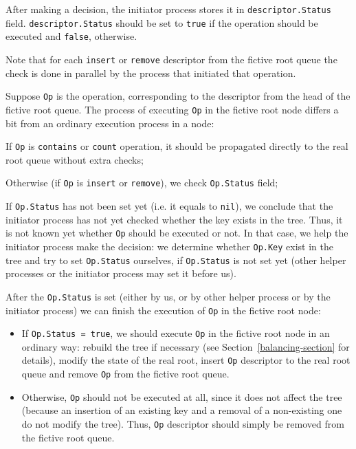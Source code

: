 \documentclass[times, dvipsnames,%
               languages={russian,english} %
              ]{itmo-student-thesis}
\begin{document}
After making a decision, the initiator process stores it in \texttt{descriptor.Status} field. \texttt{descriptor.Status} should be set to \texttt{true} if the operation should be executed and \texttt{false}, otherwise.

Note that for each \texttt{insert} or \texttt{remove} descriptor from the fictive root queue the check is done in parallel by the process that initiated that operation. 

Suppose \texttt{Op} is the operation, corresponding to the descriptor from the head of the fictive root queue. The process of executing \texttt{Op} in the fictive root node differs a bit from an ordinary execution process in a node:

\begin{nenum}
    \item If \texttt{Op} is \texttt{contains} or \texttt{count} operation, it should be propagated directly to the real root queue without extra checks;
    
    \item Otherwise (if \texttt{Op} is \texttt{insert} or \texttt{remove}), we check \texttt{Op.Status} field;
    
    \item If \texttt{Op.Status} has not been set yet (i.e. it equals to \texttt{nil}), we conclude that the initiator process has not yet checked whether the key exists in the tree. Thus, it is not known yet whether \texttt{Op} should be executed or not. In that case, we help the initiator process make the decision: we determine whether \texttt{Op.Key} exist in the tree and try to set \texttt{Op.Status} ourselves, if \texttt{Op.Status} is not set yet (other helper processes or the initiator process may set it before us).
    
    \item After the \texttt{Op.Status} is set (either by us, or by other helper process or by the initiator process) we can finish the execution of \texttt{Op} in the fictive root node:
    
    \begin{itemize}
        \item If \texttt{Op.Status = true}, we should execute \texttt{Op} in the fictive root node in an ordinary way: rebuild the tree if necessary (see Section~\ref{balancing-section} for details), modify the state of the real root, insert \texttt{Op} descriptor to the real root queue and remove \texttt{Op} from the fictive root queue.
        
        \item Otherwise, \texttt{Op} should not be executed at all, since it does not affect the tree (because an insertion of an existing key and a removal of a non-existing one do not modify the tree). Thus, \texttt{Op} descriptor should simply be removed from the fictive root queue.
    \end{itemize}
\end{nenum}
\end{document}
